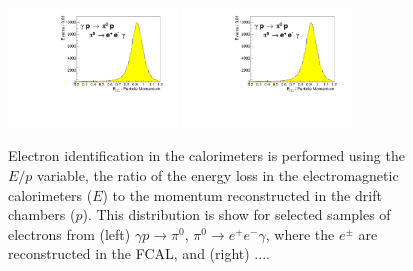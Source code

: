 \begin{figure}[tbp]
\begin{center}
\includegraphics[width=0.4\textwidth]{figures/fcal_ep.pdf}
\includegraphics[width=0.4\textwidth]{figures/fcal_ep.pdf}
\caption{\label{fig:performeop}
Electron identification in the calorimeters is performed using the $E/p$ variable, the ratio of the energy loss in the electromagnetic calorimeters ($E$) to the momentum reconstructed in the drift chambers ($p$).  This distribution is show for selected samples of electrons from (left) $\gamma p \to \pi^0$, $\pi^0 \to e^+e^-\gamma$, where the $e^\pm$ are reconstructed in the FCAL, and (right) ....
}
\end{center}
\end{figure}



